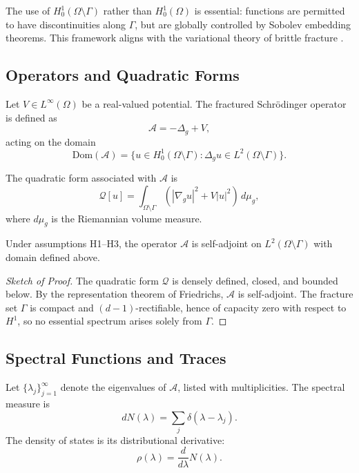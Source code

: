 \begin{remark}
The use of $H^1_0(\Omega \setminus \Gamma)$ rather than $H^1_0(\Omega)$ is essential: functions are permitted to have discontinuities along $\Gamma$, but are globally controlled by Sobolev embedding theorems. This framework aligns with the variational theory of brittle fracture \cite{BourdinFrancfortMarigo2008}.
\end{remark}

\subsection{Operators and Quadratic Forms}

\begin{definition}
Let $V \in L^\infty(\Omega)$ be a real-valued potential. The fractured Schrödinger operator is defined as
\[
\mathcal{A} = -\Delta_g + V,
\]
acting on the domain
\[
\mathrm{Dom}(\mathcal{A}) = \{ u \in H^1_0(\Omega \setminus \Gamma): \Delta_g u \in L^2(\Omega\setminus\Gamma)\}.
\]
\end{definition}

\begin{definition}
The quadratic form associated with $\mathcal{A}$ is
\[
\mathcal{Q}[u] = \int_{\Omega \setminus \Gamma} \left( |\nabla_g u|^2 + V |u|^2 \right) \, d\mu_g,
\]
where $d\mu_g$ is the Riemannian volume measure. 
\end{definition}

\begin{proposition}
Under assumptions H1–H3, the operator $\mathcal{A}$ is self-adjoint on $L^2(\Omega \setminus \Gamma)$ with domain defined above.
\end{proposition}

\begin{proof}[Sketch of Proof]
The quadratic form $\mathcal{Q}$ is densely defined, closed, and bounded below.
By the representation theorem of Friedrichs, $\mathcal{A}$ is self-adjoint. 
The fracture set $\Gamma$ is compact and $(d-1)$-rectifiable, hence of capacity zero with respect to $H^1$, so no essential spectrum arises solely from $\Gamma$.
\end{proof}

\subsection{Spectral Functions and Traces}

\begin{definition}
Let $\{ \lambda_j \}_{j=1}^\infty$ denote the eigenvalues of $\mathcal{A}$, listed with multiplicities.
The spectral measure is
\[
dN(\lambda) = \sum_{j} \delta(\lambda - \lambda_j).
\]
The density of states is its distributional derivative:
\[
\rho(\lambda) = \frac{d}{d\lambda} N(\lambda).
\]
\end{definition}

